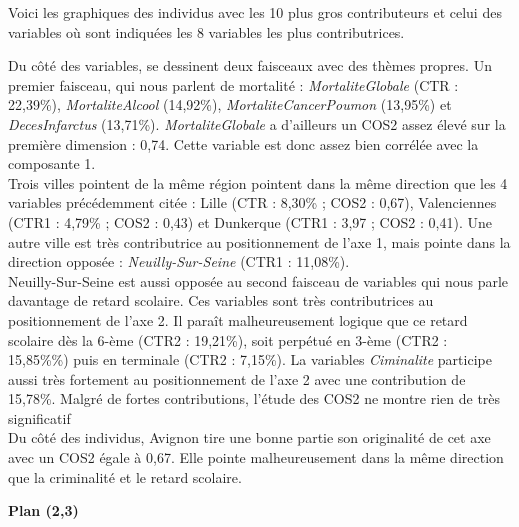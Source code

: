 \documentclass{article}
\begin{document}
Voici les graphiques des individus avec les 10 plus gros contributeurs et celui des variables où sont indiquées les 8 variables les plus contributrices.

Du côté des variables, se dessinent deux faisceaux avec des thèmes propres. Un premier faisceau, qui nous parlent de mortalité : \emph{MortaliteGlobale} (CTR : 22,39\%), \emph{MortaliteAlcool} (14,92\%), \emph{MortaliteCancerPoumon} (13,95\%) et \emph{DecesInfarctus} (13,71\%). \emph{MortaliteGlobale} a d'ailleurs un COS2 assez élevé sur la première dimension : 0,74. Cette variable est donc assez bien corrélée avec la composante 1.\\

Trois villes  pointent de la même région pointent dans la même direction que les 4 variables précédemment citée : Lille (CTR : 8,30\% ;  COS2 : 0,67), Valenciennes (CTR1 : 4,79\% ; COS2 : 0,43) et Dunkerque (CTR1 : 3,97 ; COS2 : 0,41). Une autre ville est très contributrice au positionnement de l'axe 1, mais pointe dans la direction opposée : \emph{Neuilly-Sur-Seine} (CTR1 : 11,08\%). \\

Neuilly-Sur-Seine est aussi opposée au second faisceau de variables qui nous parle davantage de retard scolaire. Ces variables sont très contributrices au positionnement de l'axe 2. Il paraît malheureusement logique que ce retard scolaire dès la 6-ème (CTR2 : 19,21\%), soit perpétué en 3-ème (CTR2 : 15,85\%\%) puis en terminale (CTR2 : 7,15\%). La variables \emph{Ciminalite} participe aussi très fortement au positionnement de l'axe 2 avec une contribution de 15,78\%. Malgré de fortes contributions, l'étude des COS2 ne montre rien de très significatif \\

Du côté des individus, Avignon tire une bonne partie son originalité de cet axe avec un COS2 égale à 0,67. Elle pointe malheureusement dans la même direction que la criminalité et le retard scolaire.

\bigskip

{\large \textbf{Plan (2,3)}}
 
\end{document}

